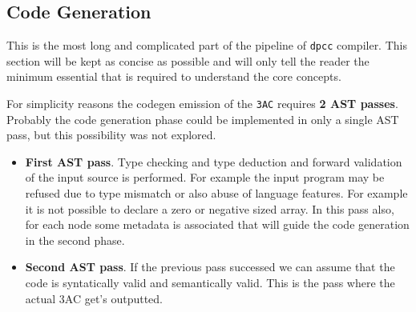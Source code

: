 \documentclass[a4paper]{article}
\begin{document}
\subsection{Code Generation}

This is the most long and complicated part of the pipeline of \texttt{dpcc} compiler.
This section will be kept as concise as possible and will only tell the reader the minimum essential that is required
to understand the core concepts.

For simplicity reasons the codegen emission of the \texttt{3AC} requires \textbf{2 AST passes}. Probably the code generation
phase could be implemented in only a single AST pass, but this possibility was not explored.



\begin{itemize}
    \item \textbf{First AST pass}. Type checking and type deduction and forward validation of the input source is performed. For example the input program may be refused due to type mismatch or also abuse of language features. For example it is not possible to declare a zero or negative sized array. In this pass also, for each node some metadata is associated that will guide the code generation in the second phase.
    \item \textbf{Second AST pass}. If the previous pass successed we can assume that the code is syntatically valid and semantically valid. This is the pass where the actual 3AC get's outputted.
\end{itemize}
\end{document}

